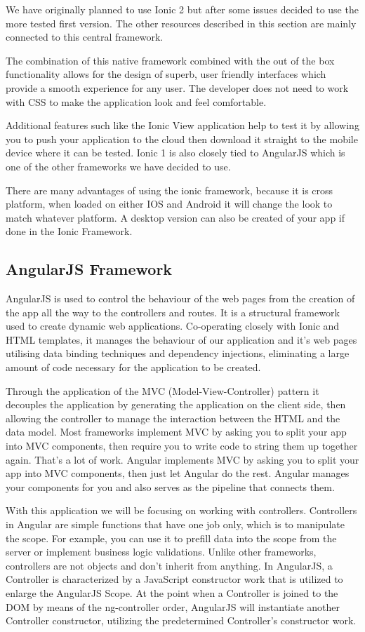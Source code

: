 We have originally planned to use Ionic 2 but after some issues decided to use the more tested first version. The other resources described in this section are mainly connected to this central framework.

The combination of this native framework combined with the out of the box functionality allows for the design of superb, user friendly interfaces which provide a smooth experience for any user. The developer does not need to work with CSS to make the application look and feel comfortable.

Additional features such like the Ionic View application help to test it by allowing you to push your application to the cloud then download it straight to the mobile device where it can be tested. Ionic 1 is also closely tied to AngularJS which is one of the other frameworks we have decided to use.

There are many advantages of using the ionic framework, because it is cross platform, when loaded on either IOS and Android it will change the look to match whatever platform. A desktop version can also be created of your app if done in the Ionic Framework.

\subsection{AngularJS Framework}
AngularJS is used to control the behaviour of the web pages from the creation of the app all the way to the controllers and routes. It is a structural framework used to create dynamic web applications. Co-operating closely with Ionic and HTML templates, it manages the behaviour of our application and it's web pages utilising data binding techniques and dependency injections, eliminating a large amount of code necessary for the application to be created.

Through the application of the MVC (Model-View-Controller) pattern it decouples the application by generating the application on the client side,
then allowing the controller to manage the interaction between the HTML and the data model. Most frameworks implement MVC by asking you to split your app into MVC components, then require you to write code to string them up together again.\cite{angular} That’s a lot of work. Angular implements MVC by asking you to split your app into MVC components, then just let Angular do the rest. Angular manages your components for you and also serves as the pipeline that connects them.\cite{angular}

With this application we will be focusing on working with controllers. Controllers in Angular are simple functions that have one job only, which is to manipulate the scope.\cite{angular} For example, you can use it to prefill data into the scope from the server or implement business logic validations.\cite{angular} Unlike other frameworks, controllers are not objects and don’t inherit from anything.\cite{angular} In AngularJS, a Controller is characterized by a JavaScript constructor work that is utilized to enlarge the AngularJS Scope. At the point when a Controller is joined to the DOM by means of the ng-controller order, AngularJS will instantiate another Controller constructor, utilizing the predetermined Controller's constructor work.

